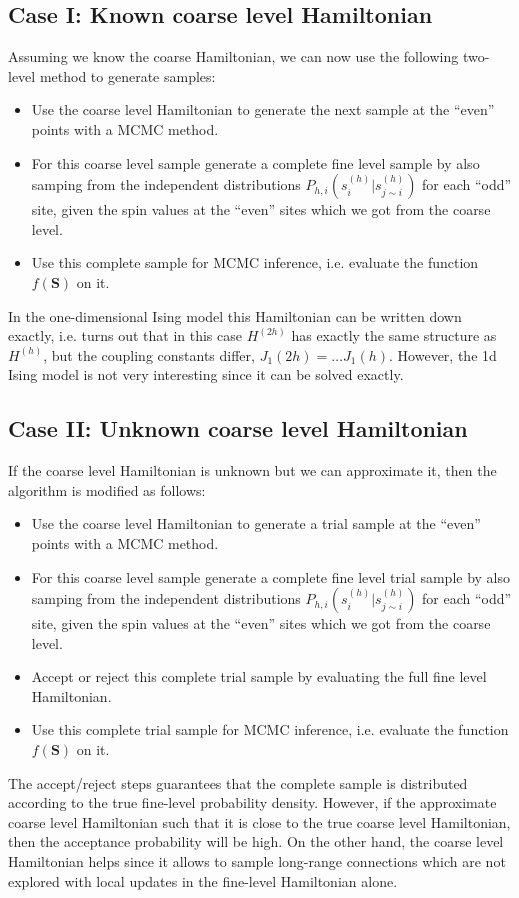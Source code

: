 \documentclass[11pt]{article}
\renewcommand{\vec}[1]{\boldsymbol{#1}}
\begin{document}
\subsection*{Case I: Known coarse level Hamiltonian}
Assuming we know the coarse Hamiltonian, we can now use the following two-level method to generate samples:
\begin{itemize}
\item Use the coarse level Hamiltonian to generate the next sample at the ``even'' points with a MCMC method.
\item For this coarse level sample generate a complete fine level sample by also samping from the independent distributions $P_{h,i}(s^{(h)}_i|s^{(h)}_{j\sim i})$ for each ``odd'' site, given the spin values at the ``even'' sites which we got from the coarse level.
  \item Use this complete sample for MCMC inference, i.e. evaluate the function $f(\vec{S})$ on it.
\end{itemize}
In the one-dimensional Ising model this Hamiltonian can be written down exactly, i.e. turns out that in this case $H^{(2h)}$ has exactly the same structure as $H^{(h)}$, but the coupling constants differ, $J_1(2h)= \dots J_1(h)$. However, the 1d Ising model is not very interesting since it can be solved exactly.
\subsection*{Case II: Unknown coarse level Hamiltonian}
If the coarse level Hamiltonian is unknown but we can approximate it, then the algorithm is modified as follows:
\begin{itemize}
\item Use the coarse level Hamiltonian to generate a trial sample at the ``even'' points with a MCMC method.
\item For this coarse level sample generate a complete fine level trial sample by also samping from the independent distributions $P_{h,i}(s^{(h)}_i|s^{(h)}_{j\sim i})$ for each ``odd'' site, given the spin values at the ``even'' sites which we got from the coarse level.
  \item Accept or reject this complete trial sample by evaluating the full fine level Hamiltonian.
  \item Use this complete trial sample for MCMC inference, i.e. evaluate the function $f(\vec{S})$ on it.
\end{itemize}
The accept/reject steps guarantees that the complete sample is distributed according to the true fine-level probability density. However, if the approximate coarse level Hamiltonian such that it is close to the true coarse level Hamiltonian, then the acceptance probability will be high. On the other hand, the coarse level Hamiltonian helps since it allows to sample long-range connections which are not explored with local updates in the fine-level Hamiltonian alone.
\end{document}
